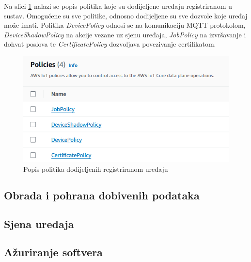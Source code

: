 Na slici \ref{fig:policies} nalazi se popis politika koje su dodijeljene uređaju registriranom u sustav. Omogućene su sve politike, odnosno dodijeljene su sve dozvole koje uređaj može imati. Politika \textit{DevicePolicy} odnosi se na komunikaciju MQTT protokolom, \textit{DeviceShadowPolicy} na akcije vezane uz sjenu uređaja, \textit{JobPolicy} na izvršavanje i dohvat poslova te \textit{CertificatePolicy} dozvoljava povezivanje certifikatom. 

\begin{figure}[ht]
	\centering
	\includegraphics[scale=0.8]{imgs/policies}
	\caption{Popis politika dodijeljenih registriranom uređaju}
	\label{fig:policies}
\end{figure}

\subsection{Obrada i pohrana dobivenih podataka}

\subsection{Sjena uređaja}

\subsection{Ažuriranje softvera}
